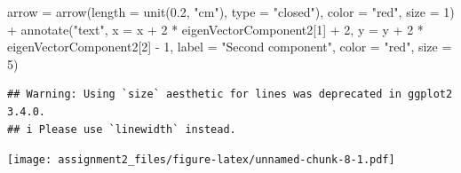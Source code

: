 \documentclass[
]{article}
\newenvironment{Shaded}{\begin{snugshade}}{\end{snugshade}}
\newcommand{\AttributeTok}[1]{\textcolor[rgb]{0.77,0.63,0.00}{#1}}
\newcommand{\DecValTok}[1]{\textcolor[rgb]{0.00,0.00,0.81}{#1}}
\newcommand{\FloatTok}[1]{\textcolor[rgb]{0.00,0.00,0.81}{#1}}
\newcommand{\FunctionTok}[1]{\textcolor[rgb]{0.00,0.00,0.00}{#1}}
\newcommand{\NormalTok}[1]{#1}
\newcommand{\SpecialCharTok}[1]{\textcolor[rgb]{0.00,0.00,0.00}{#1}}
\newcommand{\StringTok}[1]{\textcolor[rgb]{0.31,0.60,0.02}{#1}}
\begin{document}
\begin{Shaded}
\begin{Highlighting}[]
                \AttributeTok{arrow =} \FunctionTok{arrow}\NormalTok{(}\AttributeTok{length =} \FunctionTok{unit}\NormalTok{(}\FloatTok{0.2}\NormalTok{, }\StringTok{"cm"}\NormalTok{), }\AttributeTok{type =} \StringTok{"closed"}\NormalTok{),}
                \AttributeTok{color =} \StringTok{"red"}\NormalTok{, }\AttributeTok{size =} \DecValTok{1}\NormalTok{) }\SpecialCharTok{+}
  \FunctionTok{annotate}\NormalTok{(}\StringTok{"text"}\NormalTok{, }\AttributeTok{x =}\NormalTok{ x }\SpecialCharTok{+} \DecValTok{2} \SpecialCharTok{*}\NormalTok{ eigenVectorComponent2[}\DecValTok{1}\NormalTok{] }\SpecialCharTok{+} \DecValTok{2}\NormalTok{, }\AttributeTok{y =}\NormalTok{ y }\SpecialCharTok{+} \DecValTok{2} \SpecialCharTok{*}\NormalTok{ eigenVectorComponent2[}\DecValTok{2}\NormalTok{] }\SpecialCharTok{{-}} \DecValTok{1}\NormalTok{, }\AttributeTok{label =} \StringTok{"Second component"}\NormalTok{, }\AttributeTok{color =} \StringTok{"red"}\NormalTok{, }\AttributeTok{size =} \DecValTok{5}\NormalTok{)}
\end{Highlighting}
\end{Shaded}

\begin{verbatim}
## Warning: Using `size` aesthetic for lines was deprecated in ggplot2 3.4.0.
## i Please use `linewidth` instead.
\end{verbatim}

\texttt{[image: assignment2\_files/figure-latex/unnamed-chunk-8-1.pdf]}
\end{document}
